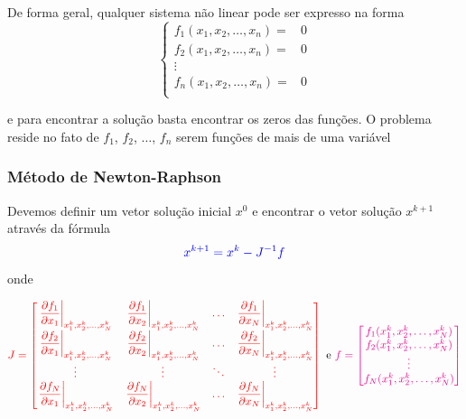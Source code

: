 \begin{frame}[c]
    De forma geral, qualquer sistema não linear pode ser expresso na forma
    \[
        \begin{cases}
            f_1(x_1, x_2, \ldots, x_n) =& 0 \\
            f_2(x_1, x_2, \ldots, x_n) =& 0 \\
            \vdots & \\
            f_n(x_1, x_2, \ldots, x_n) =& 0 \\
        \end{cases}
    \]

    e para encontrar a solução basta encontrar os zeros das funções. O problema reside no fato de $f_1$, $f_2$, $\ldots$, $f_n$ serem funções de mais de uma variável
\end{frame}

\begin{frame}
    \frametitle{Método de Newton-Raphson}
    Devemos definir um vetor solução inicial $x^0$ e encontrar o vetor solução $x^{k+1}$ através da fórmula
    \[
        \color{blue}
        x^{k+1}=x^k-J^{-1} f
    \]
    onde

    \[
        \color{red}
        J=
        \begin{bmatrix}
            \left. \dfrac{\partial f_1}{\partial x_1}\right\rvert_{x_1^k,x_2^k,\ldots,x^k_N} &
            \left. \dfrac{\partial f_1}{\partial x_2}\right\rvert_{x_1^k,x_2^k,\ldots,x^k_N} & \ldots &
            \left. \dfrac{\partial f_1}{\partial x_N}\right\rvert_{x_1^k,x_2^k,\ldots,x^k_N} \\
            \left. \dfrac{\partial f_2}{\partial x_1}\right\rvert_{x_1^k,x_2^k,\ldots,x^k_N} &
            \left. \dfrac{\partial f_2}{\partial x_2}\right\rvert_{x_1^k,x_2^k,\ldots,x^k_N} & \ldots &
            \left. \dfrac{\partial f_2}{\partial x_N}\right\rvert_{x_1^k,x_2^k,\ldots,x^k_N} \\
            \vdots & \vdots & \ddots & \vdots \\
            \left. \dfrac{\partial f_N}{\partial x_1}\right\rvert_{x_1^k,x_2^k,\ldots,x^k_N} &
            \left. \dfrac{\partial f_N}{\partial x_2}\right\rvert_{x_1^k,x_2^k,\ldots,x^k_N} & \ldots &
            \left. \dfrac{\partial f_N}{\partial x_N}\right\rvert_{x_1^k,x_2^k,\ldots,x^k_N}
        \end{bmatrix}
        \color{black}
        \text{ e }
        \color{magenta}
        f=
        \begin{bmatrix}
            f_1(x_1^k,x_2^k,\ldots,x^k_N) \\
            f_2(x_1^k,x_2^k,\ldots,x^k_N) \\ \vdots \\
            f_N(x_1^k,x_2^k,\ldots,x^k_N)
        \end{bmatrix}
    \]

\end{frame}

